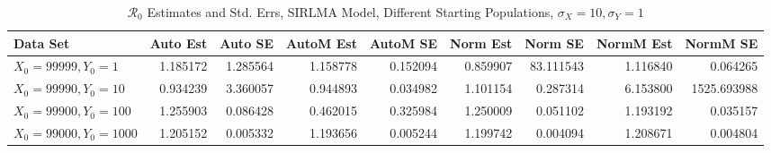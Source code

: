 \documentclass[12pt]{article}
\newcommand{\rr}{\ensuremath{\mathcal{R}_0}}
\begin{document}
\begin{table}[H]
	
	\caption{$\rr$ Estimates and Std. Errs, SIRLMA Model,
		Different Starting Populations, 
		$\sigma_X = 10, \sigma_Y = 1$}
	\begin{footnotesize}
		\hskip -1.7cm
		\begin{tabular}{l|r|r|r|r|r|r|r|r}
			\hline
			Data Set & Auto Est & Auto SE & AutoM Est & AutoM SE & Norm Est & Norm SE & NormM Est & NormM SE\\
			\hline
			$X_0 = 99999, Y_0 = 1$ & 1.185172 & 1.285564 & 1.158778 & 0.152094 & 0.859907 & 83.111543 & 1.116840 & 0.064265\\
			\hline
			$X_0 = 99990, Y_0 = 10$ & 0.934239 & 3.360057 & 0.944893 & 0.034982 & 1.101154 & 0.287314 & 6.153800 & 1525.693988\\
			\hline
			$X_0 = 99900, Y_0 = 100$ & 1.255903 & 0.086428 & 0.462015 & 0.325984 & 1.250009 & 0.051102 & 1.193192 & 0.035157\\
			\hline
			$X_0 = 99000, Y_0 = 1000$ & 1.205152 & 0.005332 & 1.193656 & 0.005244 & 1.199742 & 0.004094 & 1.208671 & 0.004804\\
			\hline
		\end{tabular}
	\end{footnotesize}
\end{table}
\end{document}
